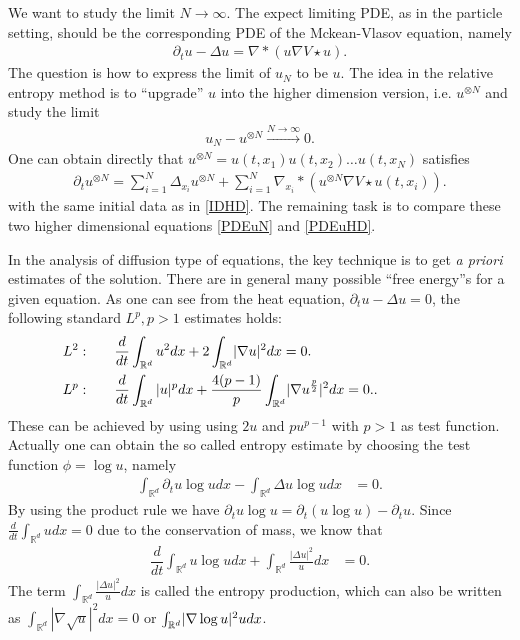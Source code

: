 \begin{goal}
We want to study the limit $N\to \infty$. The expect limiting PDE, as in the particle setting, should be the corresponding PDE of the Mckean-Vlasov equation, namely 
\begin{align*}
  \partial_t u - \Delta u = \nabla * (u\nabla V \star  u)
.\end{align*}
The question is how to express the limit of $u_N$ to be $u$. The idea in the relative entropy method is to ``upgrade'' $u$ into the higher dimension version, i.e. $u^{\otimes N}$ and study the limit
\begin{align*}
  u_N - u^{\otimes N}  \xrightarrow{N\to \infty} 0 
.\end{align*}
One can obtain directly that $u^{\otimes N}=u(t,x_1)u(t,x_2)\ldots u(t,x_N) $ satisfies
\begin{align}\label{PDEuHD}
  \partial_t u^{\otimes N}  = \sum_{i=1}^{N} \Delta _{x_i}  u^{\otimes N}  + \sum_{i=1}^{N} \nabla_{x_i}  * (u^{\otimes N} \nabla V \star u(t,x_i) )
.\end{align}
with the same initial data as in \autoref{IDHD}.
The remaining task is to compare these two higher dimensional equations \autoref{PDEuN} and \autoref{PDEuHD}.
\end{goal}

In the analysis of diffusion type of equations, the key technique is to get {\it a priori} estimates of the solution. There are in general many possible ``free energy''s for a given equation. As one can see from the heat equation,  $\partial_t u- \Delta  u = 0$, the following standard $L^p, p>1$ estimates holds:
 \begin{align*}
   \hspace{-20mm}  L^2 :\qquad &\frac{d}{dt} \int_{\mathbb{R}^{d} }  u ^2 dx + 2\int_{\mathbb{R}^{d} }  \abs{\nabla u}^2 dx = 0.\\
      \hspace{-20mm} L^p :\qquad &\frac{d}{dt} \int_{\mathbb{R}^{d} } |u| ^pdx + \frac{4(p-1)}{p}\int_{\mathbb{R}^{d} }  \abs{\nabla u^{\frac{p}{2}}}^2 dx = 0.
 .\end{align*}
These can be achieved by using using $2u$ and $pu^{p-1}$ with $p>1$ as test function. Actually one can obtain the so called entropy estimate by choosing the test function $\phi  = \log u$, namely
\begin{align*}
  \int_{\mathbb{R}^{d} } \partial_t u \log u dx- \int_{\mathbb{R}^{d} } \Delta  u \log u dx &= 0
.\end{align*}  
By using the product rule we have $\partial_t u \log u=\partial_t(u\log u)-\partial_t u$. Since $\frac{d}{dt}\int_{\mathbb{R}^{d} } udx=0$ due to the conservation of mass, we know that 
\begin{align*}
\dfrac{d}{dt}\int_{\mathbb{R}^{d} } u \log u dx+ \int_{\mathbb{R}^{d} } \frac{|\Delta  u|^2}{u} dx &= 0
.\end{align*}
The term $\int_{\mathbb{R}^{d} } \frac{|\Delta  u|^2}{u} dx$ is called the entropy production, which can also be written as $ \int_{\mathbb{R}^{d} } |\nabla \sqrt{u}|^2 dx =0$ or $\int_{\mathbb{R}^{d} }  \lvert\nabla \log u\rvert ^2 u dx $. 

